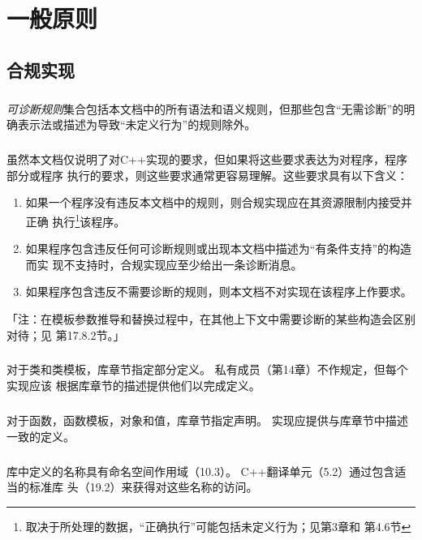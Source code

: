 \chapter{一般原则}
\section{合规实现}

\paragraph{}
\textit{可诊断规则}集合包括本文档中的所有语法和语义规则，但那些包含“无需诊断”的明
确表示法或描述为导致“未定义行为”的规则除外。

\paragraph{}
虽然本文档仅说明了对C++实现的要求，但如果将这些要求表达为对程序，程序部分或程序
执行的要求，则这些要求通常更容易理解。这些要求具有以下含义：
\begin{enumerate}
  \item 如果一个程序没有违反本文档中的规则，则合规实现应在其资源限制内接受并正确
    执行\footnote{取决于所处理的数据，“正确执行”可能包括未定义行为；见第3章和
    第4.6节}该程序。
  \item 如果程序包含违反任何可诊断规则或出现本文档中描述为“有条件支持”的构造而实
    现不支持时，合规实现应至少给出一条诊断消息。
  \item 如果程序包含违反不需要诊断的规则，则本文档不对实现在该程序上作要求。
\end{enumerate}
「注：在模板参数推导和替换过程中，在其他上下文中需要诊断的某些构造会区别对待；见
第17.8.2节。」

\paragraph{}
对于类和类模板，库章节指定部分定义。 私有成员（第14章）不作规定，但每个实现应该
根据库章节的描述提供他们以完成定义。

\paragraph{}
对于函数，函数模板，对象和值，库章节指定声明。 实现应提供与库章节中描述一致的定义。

\paragraph{}
库中定义的名称具有命名空间作用域（10.3）。 C++翻译单元（5.2）通过包含适当的标准库
头（19.2）来获得对这些名称的访问。


